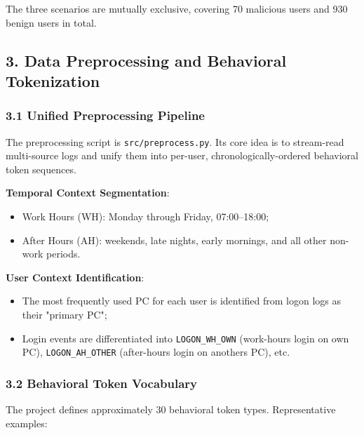 \documentclass[
  a4paper,
  11pt]{article}
\providecommand{\tightlist}{%
  \setlength{\itemsep}{0pt}\setlength{\parskip}{0pt}}
\begin{document}
The three scenarios are mutually exclusive, covering 70 malicious users
and 930 benign users in total.

\subsection{3. Data Preprocessing and Behavioral
Tokenization}\label{3-data-preprocessing-and-behavioral-tokenization}

\subsubsection{3.1 Unified Preprocessing
Pipeline}\label{31-unified-preprocessing-pipeline}

The preprocessing script is \texttt{src/preprocess.py}. Its core idea is
to stream-read multi-source logs and unify them into per-user,
chronologically-ordered behavioral token sequences.

\textbf{Temporal Context Segmentation}:

\begin{itemize}
\tightlist
\item
  Work Hours (WH): Monday through Friday, 07:00--18:00;
\item
  After Hours (AH): weekends, late nights, early mornings, and all other
  non-work periods.
\end{itemize}

\textbf{User Context Identification}:

\begin{itemize}
\tightlist
\item
  The most frequently used PC for each user is identified from logon
  logs as their "primary PC";
\item
  Login events are differentiated into \texttt{LOGON\_WH\_OWN}
  (work-hours login on own PC), \texttt{LOGON\_AH\_OTHER} (after-hours
  login on another\textquotesingle s PC), etc.
\end{itemize}

\subsubsection{3.2 Behavioral Token
Vocabulary}\label{32-behavioral-token-vocabulary}

The project defines approximately 30 behavioral token types.
Representative examples:
\end{document}
